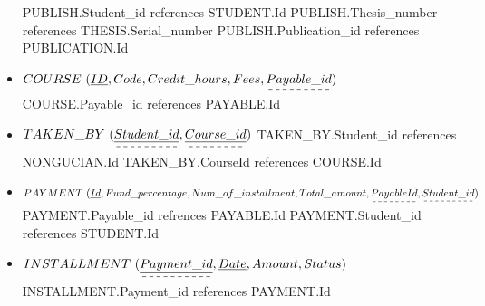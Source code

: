 \documentclass[a4paper]{article}
\begin{document}
\begin{itemize}
    \newline PUBLISH.Student\_id references STUDENT.Id 
    \newline PUBLISH.Thesis\_number references THESIS.Serial\_number 
    \newline PUBLISH.Publication\_id references PUBLICATION.Id
\newline
\item$ COURSE\ (\underline{ID}, Code, Credit\_hours, Fees, \dashuline{Payable\_id})$
    \newline COURSE.Payable\_id references PAYABLE.Id
\newline
\item$ TAKEN\_BY \ (\dashuline{\underline{Student\_id}}, \dashuline{\underline{Course\_id}})$
    \newline TAKEN\_BY.Student\_id references NONGUCIAN.Id 
    \newline TAKEN\_BY.CourseId references COURSE.Id 
\newline
\item$ PAYMENT \ (\underline{Id}, Fund\_percentage, Num\_of\_installment, Total\_amount, \dashuline{PayableId},\dashuline{Student\_id })$
    \newline PAYMENT.Payable\_id refrences PAYABLE.Id 
    \newline PAYMENT.Student\_id references STUDENT.Id
\newline 
\item$ INSTALLMENT\ (\dashuline{ \underline{Payment\_id}}, \underline{Date}, Amount, Status) $ 
    \newline INSTALLMENT.Payment\_id references PAYMENT.Id 
\end{itemize}
\end{document}
